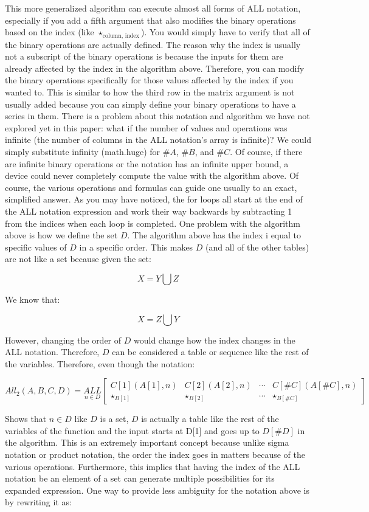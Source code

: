 \documentclass{article}
\begin{document}
This more generalized algorithm can execute almost all forms of ALL notation, especially if you add a fifth argument that also modifies the binary operations based on the index (like $\star_{\text{column, index}}$). You would simply have to verify that all of the binary operations are actually defined. The reason why the index is usually not a subscript of the binary operations is because the inputs for them are already affected by the index in the algorithm above. Therefore, you can modify the binary operations specifically for those values affected by the index if you wanted to. This is similar to how the third row in the matrix argument is not usually added because you can simply define your binary operations to have a series in them. There is a problem about this notation and algorithm we have not explored yet in this paper: what if the number of values and operations was infinite (the number of columns in the ALL notation’s array is infinite)? We could simply substitute infinity (math.huge) for $\#A$, $\#B$, and $\#C$. Of course, if there are infinite binary operations or the notation has an infinite upper bound, a device could never completely compute the value with the algorithm above. Of course, the various operations and formulas can guide one usually to an exact, simplified answer. As you may have noticed, the for loops all start at the end of the ALL notation expression and work their way backwards by subtracting 1 from the indices when each loop is completed. One problem with the algorithm above is how we define the set $D$. The algorithm above has the index i equal to specific values of $D$ in a specific order. This makes $D$ (and all of the other tables) are not like a set because given the set:

$$X=Y\bigcup Z$$

We know that:

$$X=Z\bigcup Y$$

However, changing the order of $D$ would change how the index changes in the ALL notation. Therefore, $D$ can be considered a table or sequence like the rest of the variables. Therefore, even though the notation:

$$All_2(A, B, C, D)=\underset{n \in D}{ALL} \begin{bmatrix}
C[1](A[1],n) & C[2](A[2],n) & \cdots & C[\#C](A[\#C],n) \\
\star_{B[1]}& \star_{B[2]} & \cdots & \star_{B[\#C]}
\end{bmatrix}$$

Shows that $n \in D$ like $D$ is a set, $D$ is actually a table like the rest of the variables of the function and the input starts at D[1] and goes up to $D[\#D]$ in the algorithm. This is an extremely important concept because unlike sigma notation or product notation, the order the index goes in matters because of the various operations. Furthermore, this implies that having the index of the ALL notation be an element of a set can generate multiple possibilities for its expanded expression. One way to provide less ambiguity for the notation above is by rewriting it as:
\end{document}
